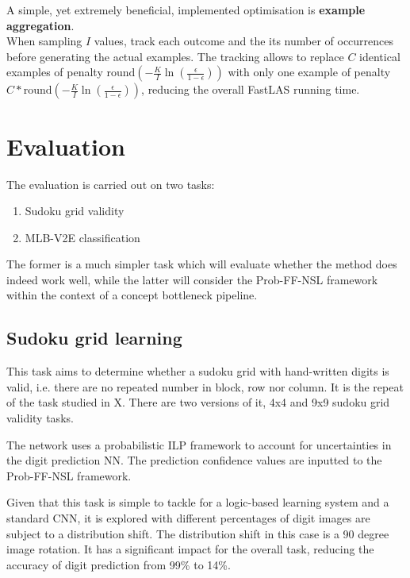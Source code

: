 A simple, yet extremely beneficial, implemented optimisation is \textbf{example aggregation}. \\
When sampling $I$ values, track each outcome and the its number of occurrences before generating the actual examples.
The tracking allows to replace $C$ identical examples of penalty $\text{round} \left ( -\frac{K}{I} \ln \left ( \frac{\epsilon}{1 - \epsilon} \right ) \right )$ with only one example of penalty $C * \text{round} \left ( -\frac{K}{I} \ln \left ( \frac{\epsilon}{1 - \epsilon} \right ) \right )$, reducing the overall FastLAS running time.



\section{Evaluation}

The evaluation is carried out on two tasks: 
\begin{enumerate}
    \item Sudoku grid validity
    \item MLB-V2E classification
\end{enumerate}

The former is a much simpler task which will evaluate whether the method does indeed work well, while the latter will consider the Prob-FF-NSL framework within the context of a concept bottleneck pipeline.

\subsection{Sudoku grid learning}

This task aims to determine whether a sudoku grid with hand-written digits is valid, i.e. there are no repeated number in block, row nor column.
It is the repeat of the task studied in X.
There are two versions of it, 4x4 and 9x9 sudoku grid validity tasks.

The network uses a probabilistic ILP framework to account for uncertainties in the digit prediction NN.
The prediction confidence values are inputted to the Prob-FF-NSL framework.

Given that this task is simple to tackle for a logic-based learning system and a standard CNN, it is explored with different percentages of digit images are subject to a distribution shift.
The distribution shift in this case is a 90 degree image rotation.
It has a significant impact for the overall task, reducing the accuracy of digit prediction from 99\% to 14\%.

